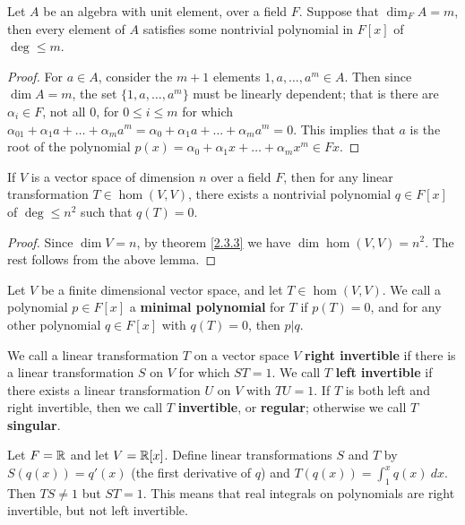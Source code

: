 \begin{lemma}\label{3.1.3}
    Let $A$ be an algebra with unit element, over a field  $F$. Suppose that
    $\dim_F{A}=m$, then every element of $A$ satisfies some nontrivial
    polynomial in  $F[x]$ of $\deg \leq m$.
\end{lemma}
\begin{proof}
    For $a \in A$, consider the  $m+1$ elements  $1, a ,\dots, a^m \in A$. Then
    since  $\dim{A}=m$, the set $\{1, a ,\dots, a^m\}$ must be linearly
    dependent; that is there are $\alpha_i \in F$, not all  $0$, for  $0 \leq i
    \leq m$ for which  $\alpha_01+\alpha_1a+\dots+\alpha_ma^m=\alpha_0+\alpha_1a
    +\dots+\alpha_ma^m=0$. This implies that $a$ is the root of the polynomial
    $p(x)=\alpha_0+\alpha_1x+\dots+\alpha_mx^m \in F{x}$.
\end{proof}

\begin{theorem}\label{3.1.4}
    If $V$ is a vector space of dimension  $n$ over a field  $F$, then for any
    linear transformation  $T \in \hom{(V,V)}$, there exists a nontrivial
    polynomial $q \in F[x]$ of $\deg \leq n^2$ such that $q(T)=0$.
\end{theorem}
\begin{proof}
    Since $\dim{V}=n$, by theorem \ref{2.3.3} we have $\dim{\hom{(V,V)}}=n^2$.
    The rest follows from the above lemma.
\end{proof}

\begin{definition}
    Let $V$ be a finite dimensional vector space, and let  $T \in \hom{(V,V)}$.
    We call a polynomial $p \in F[x]$ a \textbf{minimal polynomial} for $T$ if
    $p(T)=0$, and for any other polynomial $q \in F[x]$ with $q(T)=0$, then
    $p|q$.
\end{definition}

\begin{definition}
    We call a linear transformation $T$ on a vector space  $V$  \textbf{right
    invertible} if there is a linear transformation $S$ on $V$ for which $ST=1$.
    We call $T$  \textbf{left invertible} if there exists a linear
    transformation $U$ on  $V$ with  $TU=1$. If  $T$ is both left and right
    invertible, then we call  $T$  \textbf{invertible}, or \textbf{regular};
    otherwise we call $T$  \textbf{singular}.
\end{definition}

\begin{example}
    Let $F=\mathbb{R}$ and let $V=\mathbb{R}[x]$. Define linear transformations $S$ and  $T$ by
    $S(q(x))=q'(x)$ (the first derivative of $q$) and 
    $T(q(x))=\int_{1}^{x}{q(x) \ dx}$. 
    Then $TS \neq 1$ but  $ST = 1$. This means that real integrals
    on polynomials are right invertible, but not left invertible.
\end{example} 

